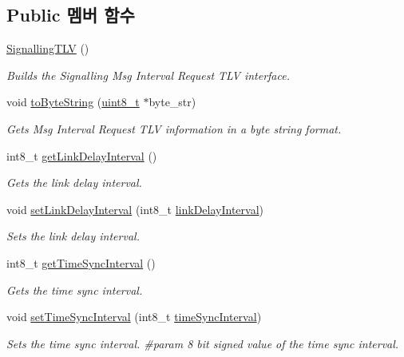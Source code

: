 \subsection*{Public 멤버 함수}
\begin{DoxyCompactItemize}
\item 
\hyperlink{class_signalling_t_l_v_a561310f7fa7be93f70cfcf56ec36c35e}{Signalling\+T\+LV} ()
\begin{DoxyCompactList}\small\item\em Builds the Signalling Msg Interval Request T\+LV interface. \end{DoxyCompactList}\item 
void \hyperlink{class_signalling_t_l_v_acd2477c3b4df4f055d57ceae73e545a0}{to\+Byte\+String} (\hyperlink{stdint_8h_aba7bc1797add20fe3efdf37ced1182c5}{uint8\+\_\+t} $\ast$byte\+\_\+str)
\begin{DoxyCompactList}\small\item\em Gets Msg Interval Request T\+LV information in a byte string format. \end{DoxyCompactList}\item 
int8\+\_\+t \hyperlink{class_signalling_t_l_v_ad0f672510d818337df0b620de5e61b4c}{get\+Link\+Delay\+Interval} ()
\begin{DoxyCompactList}\small\item\em Gets the link delay interval. \end{DoxyCompactList}\item 
void \hyperlink{class_signalling_t_l_v_aa56a408f5a79e7aa72d66b5a80cd4add}{set\+Link\+Delay\+Interval} (int8\+\_\+t \hyperlink{class_signalling_t_l_v_a9d82201fec4bc54ba5a9b690c2a927f4}{link\+Delay\+Interval})
\begin{DoxyCompactList}\small\item\em Sets the link delay interval. \end{DoxyCompactList}\item 
int8\+\_\+t \hyperlink{class_signalling_t_l_v_abe7998146e131f91ea7086a078b05683}{get\+Time\+Sync\+Interval} ()
\begin{DoxyCompactList}\small\item\em Gets the time sync interval. \end{DoxyCompactList}\item 
void \hyperlink{class_signalling_t_l_v_a0788eddbdd86828b34d8c7445eb6a761}{set\+Time\+Sync\+Interval} (int8\+\_\+t \hyperlink{class_signalling_t_l_v_a322abfc3cef9e3c3f4db4ef568a5e839}{time\+Sync\+Interval})
\begin{DoxyCompactList}\small\item\em Sets the time sync interval. \#param 8 bit signed value of the time sync interval. \end{DoxyCompactList}\item 

\end{DoxyCompactItemize}
